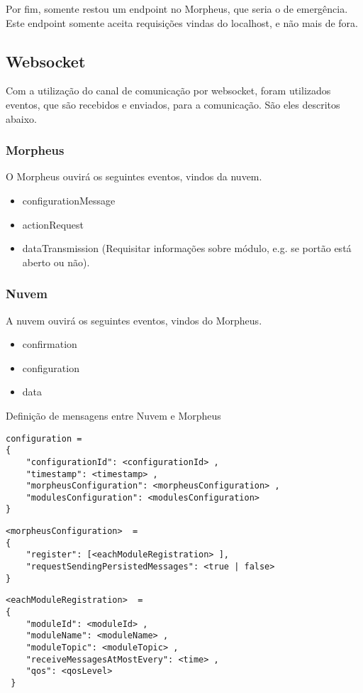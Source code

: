 Por fim, somente restou um endpoint no Morpheus, que seria o de emergência. Este endpoint somente aceita requisições vindas do localhost, e não mais de fora.

\subsection{Websocket}
Com a utilização do canal de comunicação por websocket, foram utilizados eventos, que são recebidos e enviados, para a comunicação. São eles descritos abaixo.

\subsubsection{Morpheus}
O Morpheus ouvirá os seguintes eventos, vindos da nuvem.

\begin{itemize}
\item configurationMessage
\item actionRequest
\item dataTransmission (Requisitar informações sobre módulo, e.g. se portão está aberto ou não).
\end{itemize}

\subsubsection{Nuvem}
A nuvem ouvirá os seguintes eventos, vindos do Morpheus.

\begin{itemize}
\item confirmation
\item configuration
\item data
\end{itemize}

Definição de mensagens entre Nuvem e Morpheus
\begin{lstlisting}
configuration =
{
    "configurationId": <configurationId> ,
    "timestamp": <timestamp> ,
    "morpheusConfiguration": <morpheusConfiguration> ,
    "modulesConfiguration": <modulesConfiguration>
}
\end{lstlisting}

\begin{lstlisting}
<morpheusConfiguration>  =
{
    "register": [<eachModuleRegistration> ],
    "requestSendingPersistedMessages": <true | false>
}
\end{lstlisting}

\begin{lstlisting}
<eachModuleRegistration>  =
{
    "moduleId": <moduleId> ,
    "moduleName": <moduleName> ,
    "moduleTopic": <moduleTopic> ,
    "receiveMessagesAtMostEvery": <time> ,
    "qos": <qosLevel>
 }
 \end{lstlisting}



